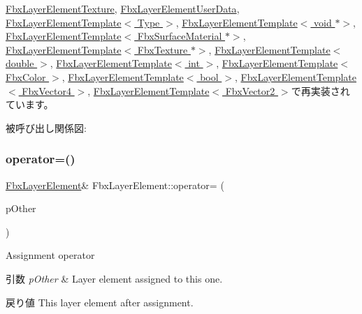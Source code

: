 \hyperlink{class_fbx_layer_element_texture_aa6ee4c7c56a71d1a3f70fa4e0806e1f5}{Fbx\+Layer\+Element\+Texture}, \hyperlink{class_fbx_layer_element_user_data_aa02fc5861dec4da68293f9660d4ff13b}{Fbx\+Layer\+Element\+User\+Data}, \hyperlink{class_fbx_layer_element_template_aa6a7b5ed38b51d4a903f9ed2e715ee79}{Fbx\+Layer\+Element\+Template$<$ Type $>$}, \hyperlink{class_fbx_layer_element_template_aa6a7b5ed38b51d4a903f9ed2e715ee79}{Fbx\+Layer\+Element\+Template$<$ void $\ast$$>$}, \hyperlink{class_fbx_layer_element_template_aa6a7b5ed38b51d4a903f9ed2e715ee79}{Fbx\+Layer\+Element\+Template$<$ Fbx\+Surface\+Material $\ast$$>$}, \hyperlink{class_fbx_layer_element_template_aa6a7b5ed38b51d4a903f9ed2e715ee79}{Fbx\+Layer\+Element\+Template$<$ Fbx\+Texture $\ast$$>$}, \hyperlink{class_fbx_layer_element_template_aa6a7b5ed38b51d4a903f9ed2e715ee79}{Fbx\+Layer\+Element\+Template$<$ double $>$}, \hyperlink{class_fbx_layer_element_template_aa6a7b5ed38b51d4a903f9ed2e715ee79}{Fbx\+Layer\+Element\+Template$<$ int $>$}, \hyperlink{class_fbx_layer_element_template_aa6a7b5ed38b51d4a903f9ed2e715ee79}{Fbx\+Layer\+Element\+Template$<$ Fbx\+Color $>$}, \hyperlink{class_fbx_layer_element_template_aa6a7b5ed38b51d4a903f9ed2e715ee79}{Fbx\+Layer\+Element\+Template$<$ bool $>$}, \hyperlink{class_fbx_layer_element_template_aa6a7b5ed38b51d4a903f9ed2e715ee79}{Fbx\+Layer\+Element\+Template$<$ Fbx\+Vector4 $>$}, \hyperlink{class_fbx_layer_element_template_aa6a7b5ed38b51d4a903f9ed2e715ee79}{Fbx\+Layer\+Element\+Template$<$ Fbx\+Vector2 $>$}で再実装されています。

被呼び出し関係図\+:
\mbox{\label{class_fbx_layer_element_a86eb3d2fb38fe2624b4e00369d6a25ea}} 
\subsubsection{\texorpdfstring{operator=()}{operator=()}}
{\footnotesize\ttfamily \hyperlink{class_fbx_layer_element}{Fbx\+Layer\+Element}\& Fbx\+Layer\+Element\+::operator= (\begin{DoxyParamCaption}\item[{\hyperlink{class_fbx_layer_element}{Fbx\+Layer\+Element} const \&}]{p\+Other }\end{DoxyParamCaption})}

Assignment operator 
\begin{DoxyParams}{引数}
{\em p\+Other} & Layer element assigned to this one. \\
\hline
\end{DoxyParams}
\begin{DoxyReturn}{戻り値}
This layer element after assignment. 
\end{DoxyReturn}
\mbox{\label{class_fbx_layer_element_a3ee62705102c228619427b17361073b7}} 
